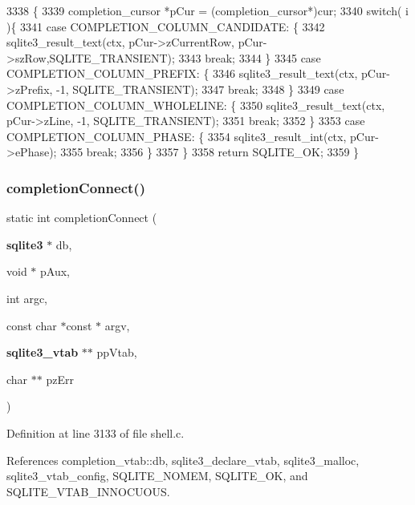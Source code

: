 \begin{DoxyCode}
3338  \{
3339   completion_cursor *pCur = (completion_cursor*)cur;
3340   \textcolor{keywordflow}{switch}( i )\{
3341     \textcolor{keywordflow}{case} COMPLETION_COLUMN_CANDIDATE: \{
3342       sqlite3_result_text(ctx, pCur->zCurrentRow, pCur->szRow,SQLITE_TRANSIENT);
3343       \textcolor{keywordflow}{break};
3344     \}
3345     \textcolor{keywordflow}{case} COMPLETION_COLUMN_PREFIX: \{
3346       sqlite3_result_text(ctx, pCur->zPrefix, -1, SQLITE_TRANSIENT);
3347       \textcolor{keywordflow}{break};
3348     \}
3349     \textcolor{keywordflow}{case} COMPLETION_COLUMN_WHOLELINE: \{
3350       sqlite3_result_text(ctx, pCur->zLine, -1, SQLITE_TRANSIENT);
3351       \textcolor{keywordflow}{break};
3352     \}
3353     \textcolor{keywordflow}{case} COMPLETION_COLUMN_PHASE: \{
3354       sqlite3_result_int(ctx, pCur->ePhase);
3355       \textcolor{keywordflow}{break};
3356     \}
3357   \}
3358   \textcolor{keywordflow}{return} SQLITE_OK;
3359 \}
\end{DoxyCode}
\mbox{\label{shell_8c_a9a72a8ed1313bd2f35edfe3aefcdb503}} 
\subsubsection{completion\+Connect()}
{\footnotesize\ttfamily static int completion\+Connect (\begin{DoxyParamCaption}\item[{\textbf{ sqlite3} $\ast$}]{db,  }\item[{void $\ast$}]{p\+Aux,  }\item[{int}]{argc,  }\item[{const char $\ast$const $\ast$}]{argv,  }\item[{\textbf{ sqlite3\+\_\+vtab} $\ast$$\ast$}]{pp\+Vtab,  }\item[{char $\ast$$\ast$}]{pz\+Err }\end{DoxyParamCaption})\hspace{0.3cm}{\ttfamily [static]}}



Definition at line 3133 of file shell.\+c.



References completion\+\_\+vtab\+::db, sqlite3\+\_\+declare\+\_\+vtab, sqlite3\+\_\+malloc, sqlite3\+\_\+vtab\+\_\+config, S\+Q\+L\+I\+T\+E\+\_\+\+N\+O\+M\+EM, S\+Q\+L\+I\+T\+E\+\_\+\+OK, and S\+Q\+L\+I\+T\+E\+\_\+\+V\+T\+A\+B\+\_\+\+I\+N\+N\+O\+C\+U\+O\+US.


